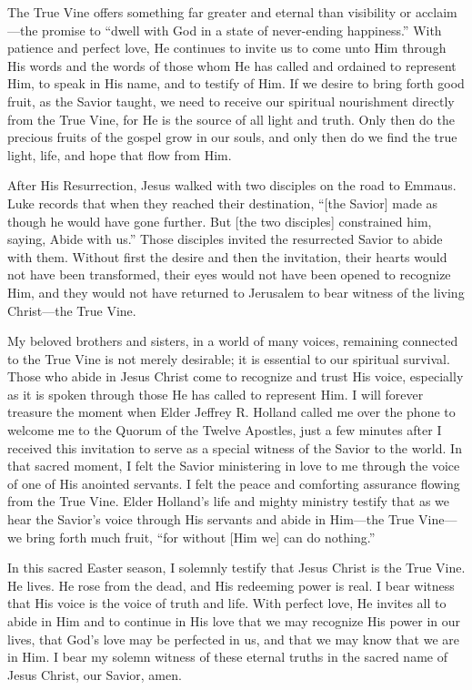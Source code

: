 \documentclass[letterpaper, 11pt]{report}
\begin{document}
The True Vine offers something far greater and eternal than visibility or acclaim—the promise to “dwell with God in a state of never-ending happiness.” With patience and perfect love, He continues to invite us to come unto Him through His words and the words of those whom He has called and ordained to represent Him, to speak in His name, and to testify of Him. If we desire to bring forth good fruit, as the Savior taught, we need to receive our spiritual nourishment directly from the True Vine, for He is the source of all light and truth. Only then do the precious fruits of the gospel grow in our souls, and only then do we find the true light, life, and hope that flow from Him.

After His Resurrection, Jesus walked with two disciples on the road to Emmaus. Luke records that when they reached their destination, “[the Savior] made as though he would have gone further. But [the two disciples] constrained him, saying, Abide with us.” Those disciples invited the resurrected Savior to abide with them. Without first the desire and then the invitation, their hearts would not have been transformed, their eyes would not have been opened to recognize Him, and they would not have returned to Jerusalem to bear witness of the living Christ—the True Vine.

My beloved brothers and sisters, in a world of many voices, remaining connected to the True Vine is not merely desirable; it is essential to our spiritual survival. Those who abide in Jesus Christ come to recognize and trust His voice, especially as it is spoken through those He has called to represent Him. I will forever treasure the moment when Elder Jeffrey R. Holland called me over the phone to welcome me to the Quorum of the Twelve Apostles, just a few minutes after I received this invitation to serve as a special witness of the Savior to the world. In that sacred moment, I felt the Savior ministering in love to me through the voice of one of His anointed servants. I felt the peace and comforting assurance flowing from the True Vine. Elder Holland’s life and mighty ministry testify that as we hear the Savior’s voice through His servants and abide in Him—the True Vine—we bring forth much fruit, “for without [Him we] can do nothing.”

In this sacred Easter season, I solemnly testify that Jesus Christ is the True Vine. He lives. He rose from the dead, and His redeeming power is real. I bear witness that His voice is the voice of truth and life. With perfect love, He invites all to abide in Him and to continue in His love that we may recognize His power in our lives, that God’s love may be perfected in us, and that we may know that we are in Him. I bear my solemn witness of these eternal truths in the sacred name of Jesus Christ, our Savior, amen.
\end{document}
